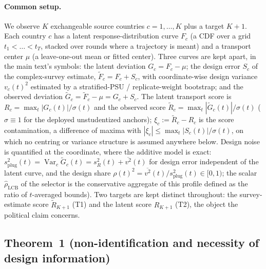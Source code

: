\documentclass[12pt]{article}
\theoremstyle{definition}
\theoremstyle{remark}
\newcommand{\Ftilde}{\widetilde{F}}
\newcommand{\Gtilde}{\widetilde{G}}
\newcommand{\rhohat}{\widehat{\rho}}
\begin{document}
\paragraph{Common setup.} We observe $K$ exchangeable source countries $c=1,\dots,K$ plus
a target $K{+}1$. Each country $c$ has a latent response-distribution curve
$F_c$ (a CDF over a grid $t_1<\dots<t_T$, stacked over rounds where a
trajectory is meant) and a transport center $\mu$ (a leave-one-out mean or
fitted center). Three curves are kept apart, in the main text's symbols: the
latent deviation $G_c=F_c-\mu$; the design error $S_c$ of the complex-survey
estimate, $\Ftilde_c=F_c+S_c$, with coordinate-wise design variance
$v_c(t)^2$ estimated by a stratified-PSU / replicate-weight bootstrap; and
the observed deviation $\Gtilde_c=\Ftilde_c-\mu=G_c+S_c$. The latent
transport score is $R_c=\max_t|G_c(t)|/\sigma(t)$ and the observed score
$\widetilde R_c=\max_t|\Gtilde_c(t)|/\sigma(t)$ ($\sigma\equiv1$ for the
deployed unstudentized anchors); $\xi_c:=\widetilde R_c-R_c$ is the score
contamination, a difference of maxima with $|\xi_c|\le\max_t|S_c(t)|/\sigma(t)$,
on which no centring or variance structure is assumed anywhere below. Design
noise is quantified at the coordinate, where the additive model is exact:
$s_{\text{plug}}^2(t)=\operatorname{Var}_c\Gtilde_c(t)=s_R^2(t)+\overline{v^2}(t)$
for design error independent of the latent curve, and the design share
$\rho(t)^2=\overline{v^2}(t)/s_{\text{plug}}^2(t)\in[0,1)$; the scalar
$\rhohat_{\text{LCB}}$ of the selector is the conservative aggregate of this
profile defined as the ratio of
$t$-averaged bounds). Two targets are kept distinct throughout: the
survey-estimate score $\widetilde R_{K+1}$ (T1) and the latent score
$R_{K+1}$ (T2), the object the political claim concerns.

\subsection{Theorem~1 (non-identification and necessity of design information)}
\end{document}
